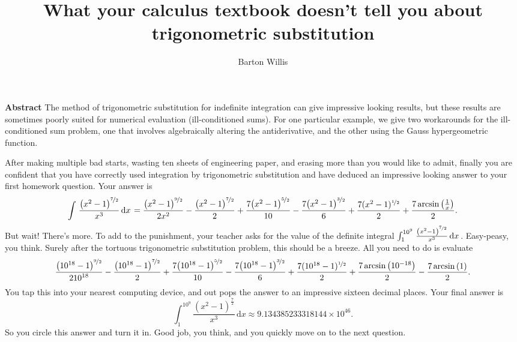 \documentclass[12pt,fleqn]{article}
\title{What your calculus textbook doesn't tell you about trigonometric substitution}
\author{Barton Willis}
\newcounter{ex}\setcounter{ex}{0}
\begin{document}
\maketitle

\begin{shaded}
  \noindent \textbf{Abstract} The method of trigonometric substitution for indefinite
  integration can give impressive looking results, but these results 
  are sometimes poorly suited for numerical evaluation (ill-conditioned sums).  
  For one particular example, we give two workarounds for the ill-conditioned sum problem, one that involves algebraically 
  altering the antiderivative, and the other using the Gauss hypergeometric function.
\end{shaded}

After making multiple bad starts, wasting ten sheets of engineering paper, 
 and erasing more  than you would like to admit, finally you are confident 
 that you have correctly used integration by trigonometric substitution and have
 deduced an impressive looking answer to your first homework question. Your answer
 is
 \begin{equation*}
    \int {\left. \frac{{{\left( {{x}^{2}}-1\right) }^{\nicefrac{7}{2}}}}{{{x}^{3}}} \, \mathrm{d}x\right.}=\frac{{{\left( {{x}^{2}}-1\right) }^{\nicefrac{9}{2}}}}{2 {{x}^{2}}}-\frac{{{\left( {{x}^{2}}-1\right) }^{\nicefrac{7}{2}}}}{2}+\frac{7 {{\left( {{x}^{2}}-1\right) }^{\nicefrac{5}{2}}}}{10}-\frac{7 {{\left( {{x}^{2}}-1\right) }^{\nicefrac{3}{2}}}}{6}+\frac{7 (x^2-1)^{\nicefrac{1}{2}}}{2}+\frac{7 \operatorname{arcsin}\left( \frac{1}{x}\right) }{2}.
\end{equation*}
But wait! There's more. To add to the punishment, your teacher asks for the value of  
the definite integral $\int_1^{10^9} {\left. \frac{{{\left( {{x}^{2}}-1\right) }^{\nicefrac{7}{2}}}}{{{x}^{3}}} \, \mathrm{d}x\right.}$. Easy-peasy, you think.
Surely after the tortuous trigonometric substitution problem, this should be a breeze. 
All you need to do is evaluate
\begin{equation*}
  \frac{{{\left( {{10}^{18}}-1\right) }^{\nicefrac{9}{2}}}}{2 {{10}^{18}}}-\frac{{{\left( {{10}^{18}}-1\right) }^{\nicefrac{7}{2}}}}{2}+\frac{7 {{\left( {{10}^{18}}-1\right) }^{\nicefrac{5}{2}}}}{10}-\frac{7 {{\left( {{10}^{18}}-1\right) }^{\nicefrac{3}{2}}}}{6}+\frac{7 (10^{18}-1)^{\nicefrac{1}{2}}}{2}+\frac{7 \operatorname{arcsin}\left( 10^{-18}\right) }{2}
    - \frac{7 \operatorname{arcsin}\left( 1 \right) }{2}.
\end{equation*}
You tap this into your nearest computing device, and out  pops the answer to an 
impressive sixteen decimal places. Your final answer is
\begin{equation*}
    \int_1^{10^9} {\left. \frac{{{\left( {{x}^{2}}-1\right) }^{\frac{7}{2}}}}{{{x}^{3}}} \, \mathrm{d}x\right.}
       \approx 9.134385233318144 \times {{10}^{46}}.
\end{equation*}
So you circle this answer and turn it in. Good job, you think, and you
quickly move on to the next question.
\end{document}
